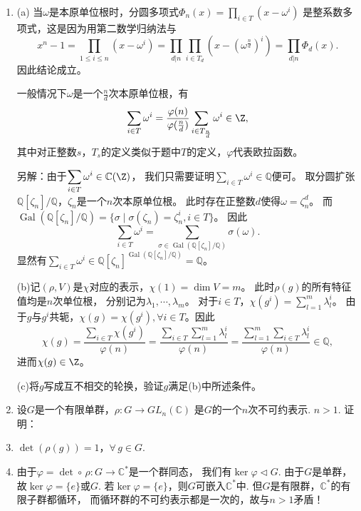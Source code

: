 \begin{enumerate}
        \item[\textbf{证明:}]
        (a) 当$\omega$是本原单位根时，分圆多项式$\displaystyle \Phi_n(x)=\prod_{i\in T}(x-\omega^i)$
        是整系数多项式，这是因为用第二数学归纳法与
        \[x^n-1=\prod_{1\le i\le n}(x-\omega^i)
        =\prod_{d|n}\prod_{i\in T_d}(x-(\omega^\frac{n}{d})^i)
        =\prod_{d|n}\Phi_d(x).\]因此结论成立。

        一般情况下$\omega$是一个$\frac{n}{d}$次本原单位根，有
        \[ \sum_{i \in T}\omega^i = \frac{\varphi(n)}{\varphi(\frac{n}{d})} 
        \sum_{i \in T_{\frac{n}{d}}} \omega^i \in \Z,\]
        其中对正整数$s$，$T_{s}$的定义类似于题中$T$的定义，$\varphi$代表欧拉函数。

        另解：由于$\displaystyle \sum_{i \in T}\omega^i \in \mathbb{C}(\Z)$，
        我们只需要证明$\displaystyle \sum_{i \in T}\omega^i \in \mathbb{Q}$便可。
        取分圆扩张$\mathbb{Q}[\zeta_n]/\mathbb{Q}$，$\zeta_n$是一个$n$次本原单位根。
        此时存在正整数$d$使得$\omega = \zeta_n^d$。
        而$\operatorname{Gal}(\mathbb{Q}[\zeta_n]/\mathbb{Q}) 
        = \{ \sigma \mid \sigma(\zeta_n) = \zeta_n^i , i\in T\}$。
        因此\[\sum_{i \in T}\omega^i 
        = \sum_{\sigma \in \operatorname{Gal}(\mathbb{Q}[\zeta_n]/\mathbb{Q})}
        \sigma(\omega).\]
        显然有$\displaystyle \sum_{i \in T}\omega^i \in 
        \mathbb{Q}[\zeta_n]^{\operatorname{Gal}(\mathbb{Q}[\zeta_n]/\mathbb{Q})} =\mathbb{Q}$。

        (b)记$(\rho,V)$是$\chi$对应的表示，$\chi(1) = \dim V = m$。
        此时$\rho(g)$的所有特征值均是$n$次单位根，
        分别记为$\lambda_1,\cdots,\lambda_m$。
        对于$i \in T$，$\chi(g^i) = \sum\limits_{l = 1}^m \lambda_l^i$。
        由于$g$与$g^i$共轭，$\chi(g) = \chi(g^i), \forall i \in T$。因此
        \[ \chi(g) = \frac{\sum_{i \in T}\chi(g^i)}{\varphi(n)} 
        = \frac{\sum_{i \in T}\sum_{l = 1}^m \lambda_l^i}{\varphi(n)}
        = \frac{\sum_{l = 1}^m \sum_{i \in T} \lambda_l^i}{\varphi(n)} \in \mathbb{Q},\]
         进而$\chi(g) \in \Z$。

        (c)将$g$写成互不相交的轮换，验证$g$满足(b)中所述条件。

        \item[12.4] 设$G$是一个有限单群，$\rho:G \rightarrow GL_{n}(\mathbb{C})$
        是$G$的一个$n$次不可约表示. $n > 1$. 证明：
        \item[(a)] $\det(\rho(g)) = 1$，$\forall \, g \in G$.
        \item[\textbf{证明:}]
            由于$\varphi = \det \circ \,\rho:G \rightarrow \mathbb{C}^{*}$是一个群同态，
            我们有$\ker \varphi \lhd G$. 由于$G$是单群，
            故$\ker \varphi = \{e\}$或$G$.
            若$\ker \varphi = \{e\}$，则$G$可嵌入$\mathbb{C}^{*}$中.
            但$G$是有限群，$\mathbb{C}^{*}$的有限子群都循环，
            而循环群的不可约表示都是一次的，故与$n > 1$矛盾！
            

\end{enumerate}
